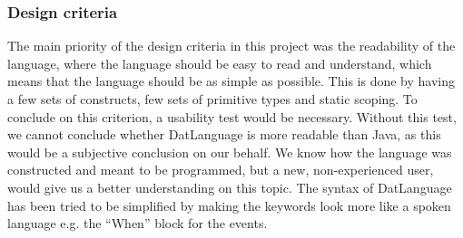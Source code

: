 \subsubsection{Design criteria}
The main priority of the design criteria in this project was the readability of the language, where the language should be easy to read and understand, which means that the language should be as simple as possible. This is done by having a few sets of constructs, few sets of primitive types and static scoping. To conclude on this criterion, a usability test would be necessary. Without this test, we cannot conclude whether DatLanguage is more readable than Java, as this would be a subjective conclusion on our behalf. We know how the language was constructed and meant to be programmed, but a new, non-experienced user, would give us a better understanding on this topic. \newline
The syntax of DatLanguage has been tried to be simplified by making the keywords look more like a spoken language e.g. the “When” block for the events. 


